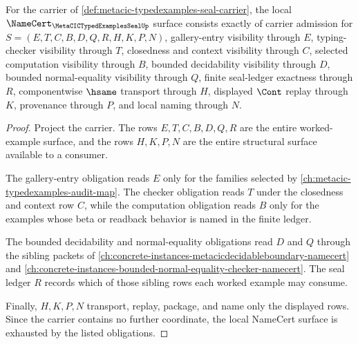 \begin{theorem}
\label{thm:metacic-typedexamples-seal-namecert-obligations}
For the carrier of \autoref{def:metacic-typedexamples-seal-carrier}, the local $\NameCert_{\MetaCICTypedExamplesSealUp}$ surface consists exactly of carrier admission for $S=(E,T,C,B,D,Q,R,H,K,P,N)$, gallery-entry visibility through $E$, typing-checker visibility through $T$, closedness and context visibility through $C$, selected computation visibility through $B$, bounded decidability visibility through $D$, bounded normal-equality visibility through $Q$, finite seal-ledger exactness through $R$, componentwise $\hsame$ transport through $H$, displayed $\Cont$ replay through $K$, provenance through $P$, and local naming through $N$.
\end{theorem}
\begin{proof}
Project the carrier. The rows $E,T,C,B,D,Q,R$ are the entire worked-example surface, and the rows $H,K,P,N$ are the entire structural surface available to a consumer.

The gallery-entry obligation reads $E$ only for the families selected by \autoref{ch:metacic-typedexamples-audit-map}. The checker obligation reads $T$ under the closedness and context row $C$, while the computation obligation reads $B$ only for the examples whose beta or readback behavior is named in the finite ledger.

The bounded decidability and normal-equality obligations read $D$ and $Q$ through the sibling packets of \autoref{ch:concrete-instances-metacicdecidableboundary-namecert} and \autoref{ch:concrete-instances-bounded-normal-equality-checker-namecert}. The seal ledger $R$ records which of those sibling rows each worked example may consume.

Finally, $H,K,P,N$ transport, replay, package, and name only the displayed rows. Since the carrier contains no further coordinate, the local NameCert surface is exhausted by the listed obligations.
\end{proof}

